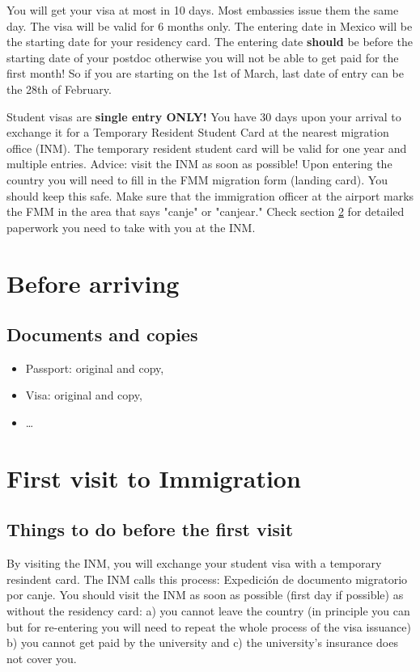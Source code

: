 \documentclass{article}
\begin{document}
\bigskip
\noindent
You will get your visa at most in 10 days. Most embassies issue them the same day. The visa will be valid for 6 months only. The entering date in Mexico will be the starting date for your residency card. The entering date \textbf{should} be before the starting date of your postdoc otherwise you will not be able to get paid for the first month! So if you are starting on the 1st of March, last date of entry can be the 28th of February. 

\bigskip
\noindent
Student visas are \textbf{single entry ONLY!} You have 30 days upon your arrival to exchange it for a Temporary Resident Student Card  at the nearest migration office (INM). The temporary resident student card will be valid for one year and multiple entries. Advice: visit the INM as soon as possible! Upon entering the country you will need to fill in the FMM migration form (landing card). You should keep this safe. Make sure that the immigration officer at the airport marks the FMM in the area that says "canje" or "canjear." Check section \ref{Immi} for detailed paperwork you need to take with you at the INM.         


\section{Before arriving}

\subsection{Documents and copies}

\begin{itemize}
\item Passport: original and copy,
\item Visa: original and copy,
\item \ldots
\end{itemize}

\section{First visit to Immigration}\label{Immi}

\subsection{Things to do before the first visit}

By visiting the INM, you will exchange your student visa with a temporary resindent card. The INM calls this process: Expedición de documento migratorio por canje. You should visit the INM as soon as possible (first day if possible) as without the residency card: a) you cannot leave the country (in principle you can but for re-entering you will need to repeat the whole process of the visa issuance) b) you cannot get paid by the university and c) the university's insurance does not cover you. 
\end{document}
